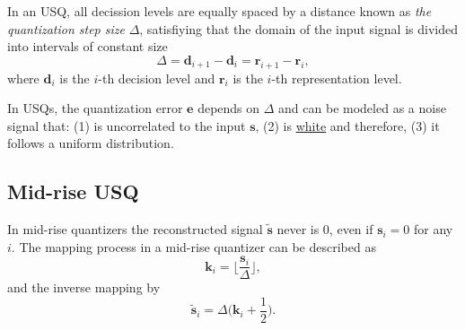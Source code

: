 In an USQ, all decission levels are equally spaced by a distance known
as \emph{the quantization step size} $\Delta$, satisfiying that the
domain of the input signal is divided into intervals of constant size
\begin{equation}
  \Delta={\mathbf d}_{i+1}-{\mathbf d}_i={\mathbf r}_{i+1}-{\mathbf r}_i,
\end{equation}
where ${\mathbf d}_i$ is the $i$-th decision level and ${\mathbf r}_i$
is the $i$-th representation level.

In USQs, the quantization error ${\mathbf e}$ depends on $\Delta$ and
can be modeled as a noise signal that: (1) is uncorrelated to the
input ${\mathbf s}$, (2) is
\href{https://en.wikipedia.org/wiki/White_noise}{white} and therefore,
(3) it follows a uniform distribution.




\subsection{Mid-rise USQ}

In mid-rise quantizers the reconstructed signal $\tilde{\mathbf s}$
never is 0, even if ${\mathbf s}_i=0$ for any $i$. The mapping process
in a mid-rise quantizer can be described as
\begin{equation}
  {\mathbf k}_i = \Big\lfloor \frac{{\mathbf s}_i}{\Delta} \Big\rfloor,
  \label{eq:mid-rise}
\end{equation}
and the inverse mapping by
\begin{equation}
  \tilde{\mathbf s}_i = \Delta\Big({\mathbf k}_i + \frac{1}{2}\Big).
  \label{eq:inverse_mid-rise}
\end{equation}

